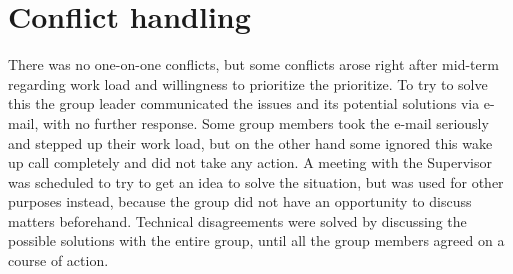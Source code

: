 \section{Conflict handling}
There was no one-on-one conflicts, but some conflicts arose right after mid-term regarding work load and willingness to prioritize the prioritize. To try to solve this the group leader communicated the issues and its potential solutions via e-mail, with no further response. Some group members took the e-mail seriously and stepped up their work load, but on the other hand some ignored this wake up call completely and did not take any action. A meeting with the Supervisor was scheduled to try to get an idea to solve the situation, but was used for other purposes instead, because the group did not have an opportunity to discuss matters beforehand.
Technical disagreements were solved by discussing the possible solutions with the entire group, until all the group members agreed on a course of action.

